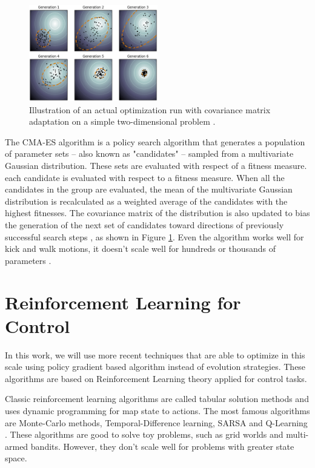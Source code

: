 \begin{figure}[ht!]
	\centering
	\includegraphics[width=0.5\textwidth]{Cap2/CMAES.eps}
	\caption{Illustration of an actual optimization run with covariance matrix adaptation on a simple two-dimensional problem
		\cite{cmaesfig}.}
	\label{cmaesfigure}
\end{figure}

The CMA-ES algorithm is a policy search algorithm that generates a population of parameter sets -- also known as "candidates" -- sampled from a multivariate Gaussian distribution. These sets are evaluated with respect of a fitness measure. each candidate is evaluated
with respect to a fitness measure. When all the candidates in
the group are evaluated, the mean of the multivariate Gaussian
distribution is recalculated as a weighted average of the
candidates with the highest fitnesses. The covariance matrix
of the distribution is also updated to bias the generation
of the next set of candidates toward directions of previously
successful search steps \cite{AAMAS11-urieli}, as shown in Figure \ref{cmaesfigure}. Even the algorithm works well for kick and walk motions, it doesn't scale well for hundreds or thousands of parameters \cite{mcalpine2017}.


\section{Reinforcement Learning for Control}

In this work, we will use more recent techniques that are able to optimize in this scale using policy gradient based algorithm instead of evolution strategies. These algorithms are based on Reinforcement Learning theory applied for control tasks.

Classic reinforcement learning algorithms are called tabular solution methods and uses dynamic programming for map state to actions. The most famous algorithms are Monte-Carlo methods, Temporal-Difference learning, SARSA \cite{Rummery94on-lineq-learning} and Q-Learning \cite{Watkins:1989}. These algorithms are good to solve toy problems, such as grid worlds and multi-armed bandits. However, they don't scale well for problems with greater state space.

